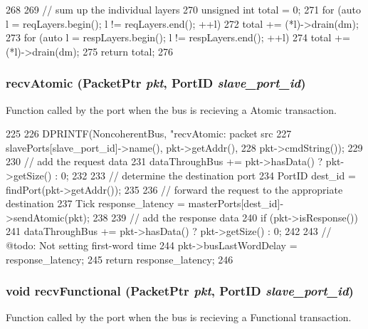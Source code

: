 \begin{DoxyCode}
268 {
269     // sum up the individual layers
270     unsigned int total = 0;
271     for (auto l = reqLayers.begin(); l != reqLayers.end(); ++l)
272         total += (*l)->drain(dm);
273     for (auto l = respLayers.begin(); l != respLayers.end(); ++l)
274         total += (*l)->drain(dm);
275     return total;
276 }
\end{DoxyCode}
\hypertarget{classNoncoherentBus_ab0e34155d341f5561834eca8e4c97759}{
\subsubsection[{recvAtomic}]{ recvAtomic ({\bf PacketPtr} {\em pkt}, \/  {\bf PortID} {\em slave\_\-port\_\-id})}}
\label{classNoncoherentBus_ab0e34155d341f5561834eca8e4c97759}
Function called by the port when the bus is recieving a Atomic transaction. 


\begin{DoxyCode}
225 {
226     DPRINTF(NoncoherentBus, "recvAtomic: packet src %
227             slavePorts[slave_port_id]->name(), pkt->getAddr(),
228             pkt->cmdString());
229 
230     // add the request data
231     dataThroughBus += pkt->hasData() ? pkt->getSize() : 0;
232 
233     // determine the destination port
234     PortID dest_id = findPort(pkt->getAddr());
235 
236     // forward the request to the appropriate destination
237     Tick response_latency = masterPorts[dest_id]->sendAtomic(pkt);
238 
239     // add the response data
240     if (pkt->isResponse())
241         dataThroughBus += pkt->hasData() ? pkt->getSize() : 0;
242 
243     // @todo: Not setting first-word time
244     pkt->busLastWordDelay = response_latency;
245     return response_latency;
246 }
\end{DoxyCode}
\hypertarget{classNoncoherentBus_a5cdfa7d369ba37394403d3c2bd5cf6d1}{
\subsubsection[{recvFunctional}]{\setlength{\rightskip}{0pt plus 5cm}void recvFunctional ({\bf PacketPtr} {\em pkt}, \/  {\bf PortID} {\em slave\_\-port\_\-id})}}
\label{classNoncoherentBus_a5cdfa7d369ba37394403d3c2bd5cf6d1}
Function called by the port when the bus is recieving a Functional transaction. 


